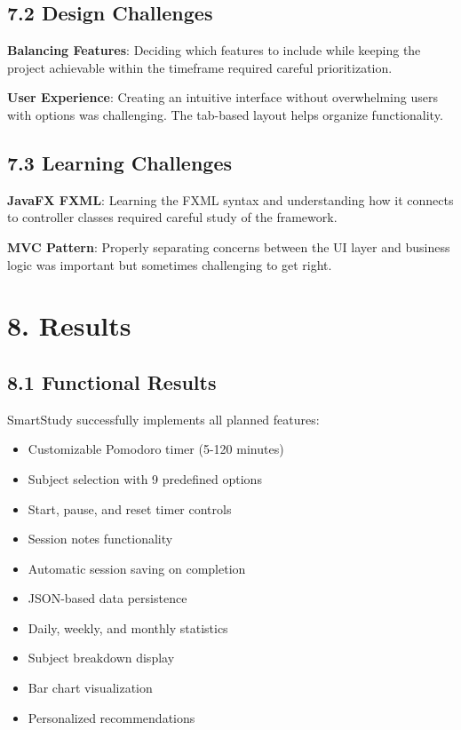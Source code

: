 \documentclass[12pt,a4paper]{article}
\begin{document}
\subsection{7.2 Design Challenges}

\textbf{Balancing Features}: Deciding which features to include while keeping the project achievable within the timeframe required careful prioritization.

\textbf{User Experience}: Creating an intuitive interface without overwhelming users with options was challenging. The tab-based layout helps organize functionality.

\subsection{7.3 Learning Challenges}

\textbf{JavaFX FXML}: Learning the FXML syntax and understanding how it connects to controller classes required careful study of the framework.

\textbf{MVC Pattern}: Properly separating concerns between the UI layer and business logic was important but sometimes challenging to get right.

\section{8. Results}

\subsection{8.1 Functional Results}

SmartStudy successfully implements all planned features:

\begin{itemize}
    \item[$\checkmark$] Customizable Pomodoro timer (5-120 minutes)
    \item[$\checkmark$] Subject selection with 9 predefined options
    \item[$\checkmark$] Start, pause, and reset timer controls
    \item[$\checkmark$] Session notes functionality
    \item[$\checkmark$] Automatic session saving on completion
    \item[$\checkmark$] JSON-based data persistence
    \item[$\checkmark$] Daily, weekly, and monthly statistics
    \item[$\checkmark$] Subject breakdown display
    \item[$\checkmark$] Bar chart visualization
    \item[$\checkmark$] Personalized recommendations
\end{itemize}
\end{document}
